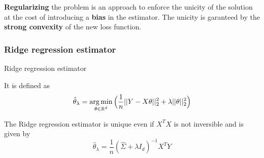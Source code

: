 \documentclass[
10pt, %
a4paper, %
oneside, %
headinclude,footinclude, %
BCOR5mm, %
]{scrartcl}
\begin{document}
\textbf{{Regularizing}} the problem is an approach to enforce the unicity of the solution at the cost of introducing a \textbf{{bias}} in the estimator. The unicity is garanteed by the \textbf{{strong convexity}} of the new loss function.

\subsubsection{\large\color{Periwinkle}Ridge regression estimator}

\begin{definition}{Ridge regression estimator}

    It is defined as
\begin{equation}
    \label{risk:ridge}
    \hat{ \theta}_{\lambda} = \operatorname*{arg\,min}_{\theta \in \mathbb{R}^d} \Big( \frac{1}{n} ||Y-X\theta||_2^2 + \lambda || \theta||_2^2 \Big)
\end{equation}
\end{definition}


\begin{proposition}

    The Ridge regression estimator is unique even if $X^TX$ is not inversible and is given by
    \begin{equation*}
	\hat{ \theta}_{\lambda} = \frac{1}{n} ( \hat{\Sigma} +\lambda I_d)^{-1}X^TY
    \end{equation*}
\end{proposition}
\end{document}
